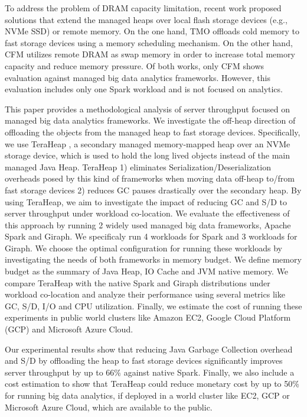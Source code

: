To address the problem of DRAM capacity limitation, recent work
proposed solutions that extend the managed heaps over local flash
storage devices (e.g., NVMe SSD) or remote memory. On the one hand,
TMO \cite{TMO} offloads cold memory to fast storage devices using
a memory scheduling mechanism. On the other hand, CFM \cite{CFM}
utilizes remote DRAM as swap memory in order to increase total memory capacity
and reduce memory pressure. Of both works, only CFM shows
evaluation against managed big data analytics frameworks. However, this evaluation
includes only one Spark workload and is not focused on analytics.

This paper provides a methodological analysis of server throughput 
focused on managed big data analytics frameworks.
We investigate the off-heap direction of offloading the objects from the
managed heap to fast storage devices.
Specifically, we use TeraHeap \cite{TeraHeap}, a secondary managed
memory-mapped heap over an NVMe storage device, which is used to hold
the long lived objects instead of the main managed Java Heap. TeraHeap
1) eliminates Serialization/Deserialization overheads posed by this
kind of frameworks when moving data off-heap to/from fast storage
devices 2) reduces GC pauses drastically over the secondary heap. By
using TeraHeap, we aim to investigate the impact of reducing GC and S/D
to server throughput under workload co-location. We evaluate
the effectiveness of this approach by running 2 widely used
managed big data frameworks, Apache Spark and Giraph. We
specificaly run 4 workloads for Spark and 3 workloads for Giraph.
We choose the optimal configuration for running these workloads by investigating the needs of both
frameworks in memory budget. We define memory budget as
the summary of Java Heap, IO Cache and JVM native memory. We compare
TeraHeap with the native Spark and Giraph distributions under workload
co-location and analyze their performance using several metrics like
GC, S/D, I/O and CPU utilization. Finally, we estimate the cost of running these
experiments in public world clusters like Amazon EC2, Google Cloud Platform (GCP)
and Microsoft Azure Cloud.

Our experimental results show that reducing Java Garbage Collection
overhead and S/D by offloading the heap to fast storage devices significantly
improves server throughput by up to 66\% against native Spark. 
Finally, we also include a cost estimation to show that
TeraHeap could reduce monetary cost by up to 50\% for running big data
analytics, if deployed in a world cluster like EC2, GCP or Microsoft Azure Cloud, which are available to
the public.

